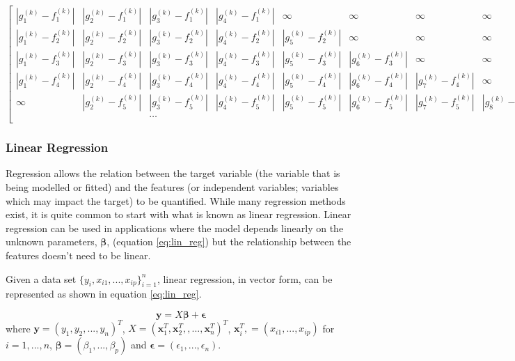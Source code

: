 \documentclass[a4paper]{article}
\begin{document}
\centerline{$\begin{bmatrix}
    |g_1^{(k)} - f_1^{(k)}| & |g_2^{(k)} - f_1^{(k)}| & |g_3^{(k)} - f_1^{(k)}| & |g_4^{(k)} -f_1^{(k)}| & \infty  & \infty& \infty & \infty & \dots & \infty \\
    |g_1^{(k)} - f_2^{(k)}| & |g_2^{(k)} - f_2^{(k)}| & |g_3^{(k)} - f_2^{(k)}| &  |g_4^{(k)} - f_2^{(k)}| & |g_5^{(k)} - f_2^{(k)}| & \infty & \infty &\infty & \dots & \infty\\
    |g_1^{(k)} - f_3^{(k)}| & |g_2^{(k)} - f_3^{(k)}| & |g_3^{(k)} - f_3^{(k)}| &  |g_4^{(k)} - f_3^{(k)}|& |g_5^{(k)}- f_3^{(k)}| & |g_6^{(k)}-f_3^{(k)}| & \infty & \infty & \dots  & \infty\\
    |g_1^{(k)}-f_4^{(k)}| & |g_2^{(k)} - f_4^{(k)}| & |g_3^{(k)} - f_4^{(k)}| & |g_4^{(k)} - f_4^{(k)}| &  |g_5^{(k)} - f_4^{(k)}| & |g_6^{(k)}- f_4^{(k)}|& |g_7^{(k)} - f_4^{(k)}| &\infty &\dots & \infty\\
    \infty & |g_2^{(k)} - f_5^{(k)}| & |g_3^{(k)} - f_5^{(k)}| & |g_4^{(k)} - f_5^{(k)}| &  |g_5^{(k)} - f_5^{(k)}|& |g_6^{(k)}- f_5^{(k)}|& |g_7^{(k)} - f_5^{(k)}| &|g_8^{(k)} - f_5^{(k)}| &\dots & \infty\\
     &  & \dots &  & &  & &  & \\
\end{bmatrix}$}


\subsubsection{Linear Regression} \label{subsubsec:linregforecast}
Regression allows the relation between the target variable (the variable that is being modelled or fitted) and the features (or independent variables; variables which may impact the target) to be quantified. While many regression methods exist, it is quite common to start with what is known as linear regression. Linear regression can be used in applications where the model depends linearly on the unknown parameters, $\boldsymbol \beta$, (equation \ref{eq:lin_reg}) but the relationship between the features doesn't need to be linear.

Given a data set $\{y_i, x_{i1}, ... , x_{ip}\}_{i=1}^n$, linear regression, in vector form, can be represented as shown in equation \ref{eq:lin_reg}.

\begin{equation} \label{eq:lin_reg}
\textbf{y} = X \boldsymbol \beta +\boldsymbol \epsilon
\end{equation}
where $\textbf{y} = (y_1, y_2, ... , y_n)^T $, $X =  (\textbf{x}_1^T, \textbf{x}_2^T,, ... ,\textbf{x}_n^T)^T$,  $\textbf{x}_i^T, = (x_{i1}, ... , x_{ip})$ for $i = 1, ... , n$, $\boldsymbol \beta = (\beta_1 , ... , \beta_p)$ and $\boldsymbol \epsilon = (\epsilon_1, ... , \epsilon_n)$.
\end{document}
